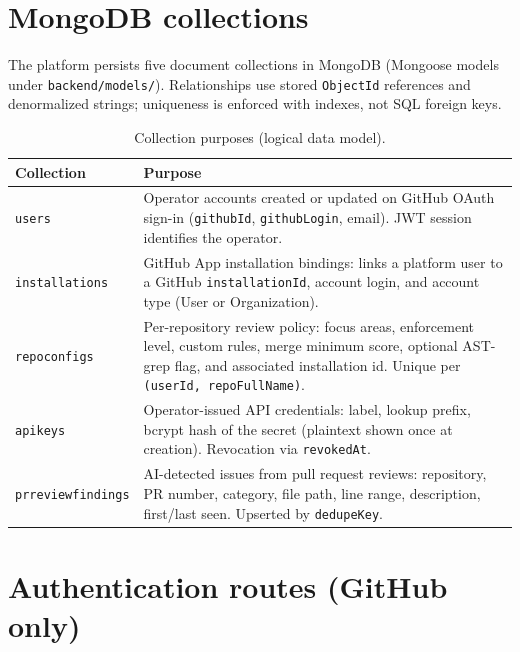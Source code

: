 
\section{MongoDB collections}
\label{sec:mongodb-collections}

The platform persists five document collections in MongoDB (Mongoose models under \texttt{backend/models/}). Relationships use stored \texttt{ObjectId} references and denormalized strings; uniqueness is enforced with indexes, not SQL foreign keys.

\begin{table}[htbp]
  \centering
  \caption{Collection purposes (logical data model).}
  \label{tab:collection-purposes}
  \begin{tabular}{@{}p{}p{}@{}}
    \toprule
    \textbf{Collection} & \textbf{Purpose} \\
    \midrule
    \texttt{users} &
    Operator accounts created or updated on GitHub OAuth sign-in (\texttt{githubId}, \texttt{githubLogin}, email). JWT session identifies the operator. \\
    \texttt{installations} &
    GitHub App installation bindings: links a platform user to a GitHub \texttt{installationId}, account login, and account type (User or Organization). \\
    \texttt{repoconfigs} &
    Per-repository review policy: focus areas, enforcement level, custom rules, merge minimum score, optional AST-grep flag, and associated installation id. Unique per \texttt{(userId, repoFullName)}. \\
    \texttt{apikeys} &
    Operator-issued API credentials: label, lookup prefix, bcrypt hash of the secret (plaintext shown once at creation). Revocation via \texttt{revokedAt}. \\
    \texttt{prreviewfindings} &
    AI-detected issues from pull request reviews: repository, PR number, category, file path, line range, description, first/last seen. Upserted by \texttt{dedupeKey}. \\
    \bottomrule
  \end{tabular}
\end{table}

\section{Authentication routes (GitHub only)}
\label{sec:auth-routes-github}


